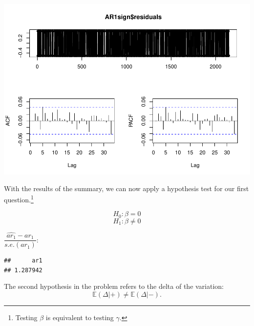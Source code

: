 \documentclass[11pt, a4paper]{report}
\newenvironment{Shaded}{\begin{snugshade}}{\end{snugshade}}
\newcommand{\DecValTok}[1]{\textcolor[rgb]{0.00,0.00,0.81}{#1}}
\newcommand{\KeywordTok}[1]{\textcolor[rgb]{0.13,0.29,0.53}{\textbf{#1}}}
\newcommand{\NormalTok}[1]{#1}
\newcommand{\OperatorTok}[1]{\textcolor[rgb]{0.81,0.36,0.00}{\textbf{#1}}}
\theoremstyle{plain}
\theoremstyle{plain}
\theoremstyle{remark}
\begin{document}
\begin{Shaded}
\end{Shaded}

\begin{center}\includegraphics{Econo2_P1_files/figure-latex/AR(1)-2} \end{center}

With the results of the summary, we can now apply a hypothesis test for
our first
question.\footnote{Testing $\beta$ is equivalent to testing $\gamma$.}

\[ H_0: \beta = 0\] \[H_1: \beta \neq 0\]

\(\dfrac{\hat{ar_1} - ar_1}{s.e.(ar_1)}\):

\begin{Shaded}
\end{Shaded}

\begin{verbatim}
##      ar1 
## 1.287942
\end{verbatim}

The second hypothesis in the problem refers to the delta of the
variation: \[\mathbb{E}(\Delta | + ) \neq \mathbb{E}(\Delta | - ).\]
\end{document}
